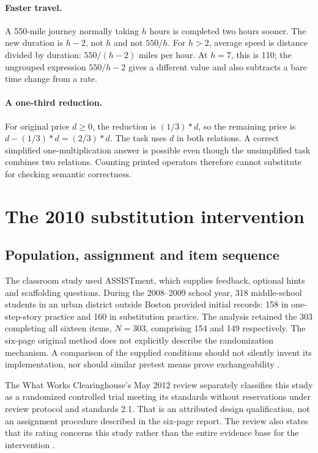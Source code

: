 \paragraph{Faster travel.}
A 550-mile journey normally taking \(h\) hours is completed two
hours sooner. The new duration is \(h-2\), not \(h\) and not
\(550/h\). For \(h>2\), average speed is distance divided by
duration: \(550/(h-2)\) miles per hour. At \(h=7\), this is
110; the ungrouped expression \(550/h-2\) gives a different value
and also subtracts a bare time change from a rate.

\paragraph{A one-third reduction.}
For original price \(d\geq0\), the reduction is \((1/3)*d\),
so the remaining price is \(d-(1/3)*d=(2/3)*d\).
The task uses \(d\) in both relations. A correct simplified
one-multiplication answer is possible even though the unsimplified
task combines two relations. Counting printed operators therefore
cannot substitute for checking semantic correctness.

\section{The 2010 substitution intervention}
\label{sec:p19-cta-intervention}

\subsection{Population, assignment and item sequence}

The classroom study used ASSISTment, which supplies feedback, optional
hints and scaffolding questions. During the 2008--2009 school year,
318 middle-school students in an urban district outside Boston
provided initial records: 158 in one-step-story practice and 160 in
substitution practice. The analysis retained the 303 completing all
sixteen items, \(N=303\), comprising 154 and 149 respectively. The six-page original method
does not explicitly describe the randomization mechanism. A
comparison of the supplied conditions should not silently invent its
implementation, nor should similar pretest means prove exchangeability
\cite[pp.~473--474]{KoedingerMcLaughlin2010LanguageTransfer}.

The What Works Clearinghouse's May 2012 review separately classifies
this study as a randomized controlled trial meeting its standards
without reservations under review protocol and standards 2.1.
That is an attributed design qualification, not an assignment procedure
described in the six-page report. The review also states that its
rating concerns this study rather than the entire evidence base for
the intervention \cite{WWC2012KoedingerMcLaughlinCTA}.

